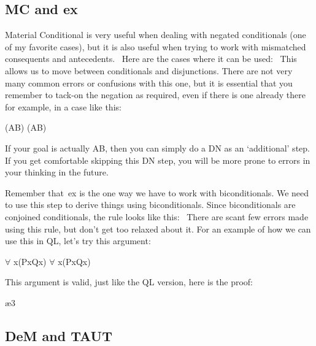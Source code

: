 \subsection{MC and \eiff ex}

Material Conditional is very useful when dealing with negated conditionals (one of my favorite cases), but it is also useful when trying to work with mismatched consequents and antecedents.  Here are the cases where it can be used: 
This allows us to move between conditionals and disjunctions. There are not very many common errors or confusions with this one, but it is essential that you remember to tack-on the negation as required, even if there is one already there for example, in a case like this:
\begin{center}
(\enot A\eif B) \therefore  (\enot \enot A\eor B)
\end{center}
If your goal is actually A\eor B, then you can simply do a DN as an `additional' step. If you get comfortable skipping this DN step, you will be more prone to errors in your thinking in the future. 

Remember that \eiff ex is the one way we have to work with biconditionals. We need to use this step to derive things using biconditionals. Since biconditionals are conjoined conditionals, the rule looks like this: 
There are scant few errors made using this rule, but don't get too relaxed about it. For an example of how we can use this in QL, let's try this argument: 
\begin{center}
$\forall$ x(Px\eiff Qx) \therefore  $\forall$ x(Px\eif Qx)
\end{center}
This argument is valid, just like the QL version, here is the proof:
\begin{fitchproof}
\ae{3}
\end{fitchproof}
\subsection{DeM and TAUT}

